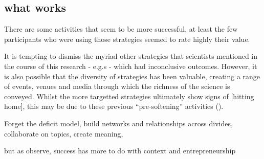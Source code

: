 \subsection{what works}
There are some activities that seem to be more successful, at least the few participants who were using those strategies seemed to rate highly their value. 

It is tempting to dismiss the myriad other strategies that scientists mentioned in the course of this research - e.g.s - which had inconclusive outcomes. However, it is also possible that the diversity of strategies has been valuable, creating a range of events, venues and media through which the richness of the science is conveyed. Whilst the more targetted strategies ultimately show signs of [hitting home], this may be due to these previous ``pre-softening'' activities (\cite{Cairney2018}).

Forget the deficit model, build networks and relationships across divides, collaborate on topics, create meaning, 

but as \textcite{CairneyO2020} observe, success has more to do with context and entrepreneurship
